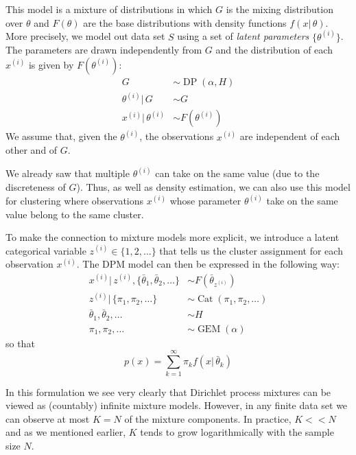 \documentclass[final,3p,times,twocolumn]{elsarticle}
\DeclareMathOperator*{\Cat}{Cat}
\DeclareMathOperator*{\DP}{DP}
\DeclareMathOperator*{\GEM}{GEM}
\begin{document}
This model is a mixture of distributions in which $G$ is the mixing distribution over $\theta$ and $F(\theta)$ are the base distributions with density functions $f(x|\,\theta)$.
More precisely, we model out data set $S$ using a set of \emph{latent parameters} $\{\theta^{(i)}\}$.
The parameters are drawn independently from $G$ and the distribution of each $x^{(i)}$ is given by $F(\theta^{(i)})$:
\begin{equation}
\label{eqn:dpm}
\begin{split}
G &\sim \DP(\alpha,H)\\
\theta^{(i)} |\,G &\sim G\\
x^{(i)} |\,\theta^{(i)} &\sim F(\theta^{(i)})
\end{split}
\end{equation}
We assume that, given the $\theta^{(i)}$, the observations $x^{(i)}$ are independent of each other and of $G$.

We already saw that multiple $\theta^{(i)}$ can take on the same value (due to the discreteness of $G$).
Thus, as well as density estimation, we can also use this model for clustering where observations $x^{(i)}$ whose parameter $\theta^{(i)}$ take on the same value belong to the same cluster.

To make the connection to mixture models more explicit, we introduce a latent categorical variable $z^{(i)} \in \{1,2,\dots\}$ that tells us the cluster assignment for each observation $x^{(i)}$.
The DPM model can then be expressed in the following way:
\begin{equation}
\begin{split}
x^{(i)} |\,z^{(i)},\{\bar \theta_1,\bar \theta_2,\dots\} &\sim F(\bar \theta_{z^{(i)}})\\
z^{(i)} |\,\{\pi_1,\pi_2,\dots\} &\sim \Cat(\pi_1,\pi_2,\dots)\\
\bar \theta_1,\bar \theta_2,\dots &\sim H\\
\pi_1,\pi_2,\dots &\sim \GEM(\alpha)
\end{split}
\end{equation}
so that
\begin{equation}
\label{eqn:dpmmixture}
p(x) = \sum_{k=1}^\infty \pi_k f(x|\,\bar \theta_k)
\end{equation}

In this formulation we see very clearly that Dirichlet process mixtures can be viewed as (countably) infinite mixture models.
However, in any finite data set we can observe at most $K = N$ of the mixture components. In practice, $K<<N$ and as we mentioned earlier, $K$ tends to grow logarithmically with the sample size $N$.
\end{document}
